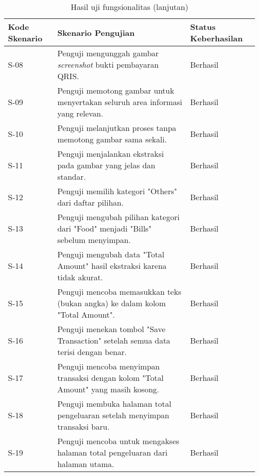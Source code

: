 \begin{table}[h!]
\ContinuedFloat
\caption{Hasil uji fungsionalitas (lanjutan)}
\begin{tabularx}{\linewidth}{|p{2cm}|X|p{2.5cm}|}
\hline
\textbf{Kode Skenario} & \textbf{Skenario Pengujian} & \textbf{Status Keberhasilan} \\
\hline
S-08 & Penguji mengunggah gambar \emph{screenshot} bukti pembayaran QRIS. & Berhasil \\
\hline
S-09 & Penguji memotong gambar untuk menyertakan seluruh area informasi yang relevan. & Berhasil \\
\hline
S-10 & Penguji melanjutkan proses tanpa memotong gambar sama sekali. & Berhasil \\
\hline
S-11 & Penguji menjalankan ekstraksi pada gambar yang jelas dan standar. & Berhasil \\
\hline
S-12 & Penguji memilih kategori "Others" dari daftar pilihan. & Berhasil \\
\hline
S-13 & Penguji mengubah pilihan kategori dari "Food" menjadi "Bills" sebelum menyimpan. & Berhasil \\
\hline
S-14 & Penguji mengubah data "Total Amount" hasil ekstraksi karena tidak akurat. & Berhasil \\
\hline
S-15 & Penguji mencoba memasukkan teks (bukan angka) ke dalam kolom "Total Amount". & Berhasil \\
\hline
S-16 & Penguji menekan tombol "Save Transaction" setelah semua data terisi dengan benar. & Berhasil \\
\hline
S-17 & Penguji mencoba menyimpan transaksi dengan kolom "Total Amount" yang masih kosong. & Berhasil \\
\hline
S-18 & Penguji membuka halaman total pengeluaran setelah menyimpan transaksi baru. & Berhasil \\
\hline
S-19 & Penguji mencoba untuk mengakses halaman total pengeluaran dari halaman utama. & Berhasil \\
\hline
\end{tabularx}
\end{table}